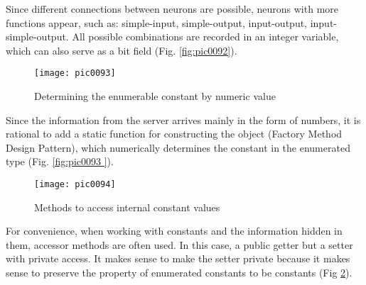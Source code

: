 Since different connections between neurons are possible, neurons with more functions appear, such as: simple-input, simple-output, input-output, input-simple-output. All possible combinations are recorded in an integer variable, which can also serve as a bit field (Fig. \ref{fig:pic0092}).

\begin{figure}[h]
\centering
\texttt{[image: pic0093]}
\caption{Determining the enumerable constant by numeric value}
\label{fig:pic0093}
\end{figure}
\FloatBarrier

Since the information from the server arrives mainly in the form of numbers, it is rational to add a static function for constructing the object (Factory Method Design Pattern), which numerically determines the constant in the enumerated type (Fig. \ref{fig:pic0093 }).

\begin{figure}[h]
\centering
\texttt{[image: pic0094]}
\caption{Methods to access internal constant values}
\label{fig:pic0094}
\end{figure}
\FloatBarrier

For convenience, when working with constants and the information hidden in them, accessor methods are often used. In this case, a public getter but a setter with private access. It makes sense to make the setter private because it makes sense to preserve the property of enumerated constants to be constants (Fig \ref{fig:pic0094}).
